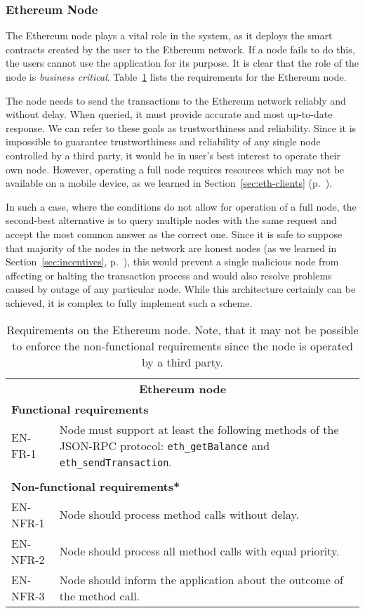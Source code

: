 \subsubsection{Ethereum Node}
The Ethereum node plays a vital role in the system, as it deploys the smart contracts created by the user to the Ethereum network. If a node fails to do this, the users cannot use the application for its purpose. It is clear that the role of the node is \textit{business critical}. Table~\ref{fig:reqs-node} lists the requirements for the Ethereum node.

The node needs to send the transactions to the Ethereum network reliably and without delay. When queried, it must provide accurate and most up-to-date response. We can refer to these goals as trustworthiness and reliability. Since it is impossible to guarantee trustworthiness and reliability of any single node controlled by a third party, it would be in user’s best interest to operate their own node. However, operating a full node requires resources which may not be available on a mobile device, as we learned in Section~\ref{sec:eth-clients} (p.~\pageref{sec:eth-clients}).

In such a case, where the conditions do not allow for operation of a full node, the second-best alternative is to query multiple nodes with the same request and accept the most common answer as the correct one. Since it is safe to suppose that majority of the nodes in the network are honest nodes (as we learned in Section~\ref{sec:incentives}, p.~\pageref{sec:incentives}), this would prevent a single malicious node from affecting or halting the transaction process and would also resolve problems caused by outage of any particular node. While this architecture certainly can be achieved, it is complex to fully implement such a scheme. 

\begin{table}[ht]
    \centering
    \begin{tabularx}{\textwidth}{|l X|}
        \hline
        \multicolumn{2}{|c|}{\textbf{Ethereum node}}\\
        \multicolumn{2}{|l|}{\textbf{Functional requirements}}\\
        EN-FR-1&Node must support at least the following methods of the JSON-RPC protocol: \texttt{eth\_getBalance} and \texttt{eth\_sendTransaction}.\\
        &\\
        \multicolumn{2}{|l|}{\textbf{Non-functional requirements*}}\\
        EN-NFR-1&Node should process method calls without delay.\\
        EN-NFR-2&Node should process all method calls with equal priority.\\
        EN-NFR-3&Node should inform the application about the outcome of the method call.\\
        \hline
    \end{tabularx}
    \caption{Requirements on the Ethereum node. Note, that it may not be possible to enforce the non-functional requirements since the node is operated by a third party.}
    \label{fig:reqs-node}
\end{table}

